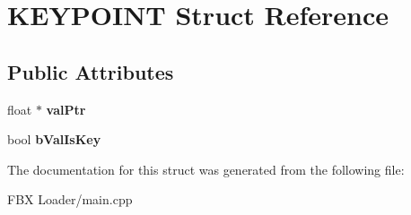 \hypertarget{struct_k_e_y_p_o_i_n_t}{}\section{K\+E\+Y\+P\+O\+I\+NT Struct Reference}
\label{struct_k_e_y_p_o_i_n_t}
\subsection*{Public Attributes}
\begin{DoxyCompactItemize}
\item 
float $\ast$ {\bfseries val\+Ptr}\hypertarget{struct_k_e_y_p_o_i_n_t_a38916edf63d06ffa5fb725ae101a1d78}{}\label{struct_k_e_y_p_o_i_n_t_a38916edf63d06ffa5fb725ae101a1d78}

\item 
bool {\bfseries b\+Val\+Is\+Key}\hypertarget{struct_k_e_y_p_o_i_n_t_a1051bc1a9a1f9f784354ec6f7e8623f9}{}\label{struct_k_e_y_p_o_i_n_t_a1051bc1a9a1f9f784354ec6f7e8623f9}

\end{DoxyCompactItemize}


The documentation for this struct was generated from the following file\+:\begin{DoxyCompactItemize}
\item 
F\+B\+X Loader/main.\+cpp\end{DoxyCompactItemize}
